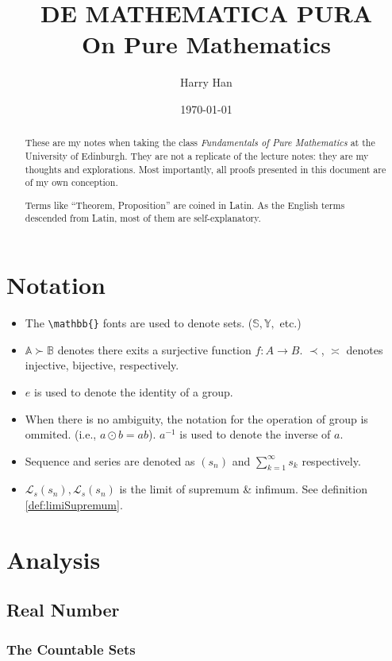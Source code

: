 \documentclass[12pt, a4paper]{report}
\title{
	DE MATHEMATICA PURA \\
	\large On Pure Mathematics
}
\author{Harry Han}
\date{\today}
\theoremstyle{definition}
\theoremstyle{definition}
\theoremstyle{remark}
\begin{document}
\maketitle
\tableofcontents

\newpage

\begin{abstract}
	These are my notes when taking the class \emph{Fundamentals of Pure Mathematics} at the University of Edinburgh. They are not a replicate of the lecture notes: they are my thoughts and explorations. 
	Most importantly, all proofs presented in this document are of my own conception. 

	Terms like ``Theorem, Proposition'' are coined in Latin. As the English terms descended from Latin, most of them are self-explanatory. 
\end{abstract}
\chapter{Notation}

\begin{itemize}
	\item The \verb|\mathbb{}| fonts are used to denote sets. ($\mathbb{S}, \mathbb{Y},$ etc.)
	\item $\mathbb{A} \succ \mathbb{B}$ denotes there exits a surjective function $f:A\rightarrow B$. $\prec$, $\asymp$ denotes injective, bijective, respectively.
	\item $e$ is used to denote the identity of a group.
	\item When there is no ambiguity, the notation for the operation of group is ommited. (i.e., $a \odot b = ab$).
		$a^{-1}$ is used to denote the inverse of $a$.
	\item Sequence and series are denoted as $(s_n)$ and $\sum^{\infty}_{k=1}s_k$ respectively.
	\item $\mathcal{L}_s(s_n), \mathcal{L}_s(s_n)$ is the limit of supremum \& infimum. See definition \ref{def:limiSupremum}.

\end{itemize}

\chapter{Analysis}
\section{Real Number}
\subsection{The Countable Sets}
\end{document}
